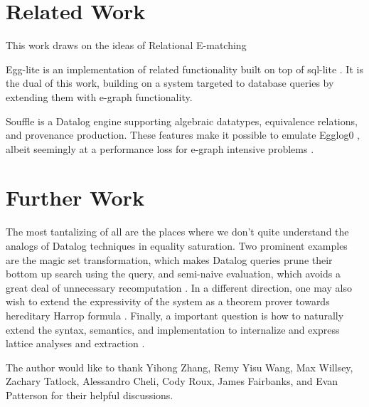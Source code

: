 \documentclass[sigplan,10pt,review]{acmart} %
\begin{document}
\section{Related Work}
This work draws on the ideas of Relational E-matching \cite{rel_ematch}

Egg-lite is an implementation of related functionality built on top of sql-lite \cite{egg-lite}. It is the dual of this work, building on a system targeted to database queries by extending them with e-graph functionality.

Souffle\cite{souffle} is a Datalog engine supporting algebraic datatypes, equivalence relations, and provenance production. These features make it possible to emulate Egglog0 \cite{naivesouffle}, albeit seemingly at a performance loss for e-graph intensive problems \cite{soufflehack}.

\section{Further Work}
The most tantalizing of all are the places where we don't quite understand the analogs of Datalog techniques in equality saturation.
Two prominent examples are the magic set transformation, which makes Datalog queries prune their bottom up search using the query, and semi-naive evaluation, which avoids a great deal of unnecessary recomputation \cite{databases}.
In a different direction, one may also wish to extend the expressivity of the system as a theorem prover towards hereditary Harrop formula \cite{miller_nadathur_2012}.
Finally, a important question is how to naturally extend the syntax, semantics, and implementation to internalize and express lattice analyses and extraction \cite{egg}.

\begin{acks}                            %
The author would like to thank Yihong Zhang, Remy Yisu Wang, Max Willsey, Zachary Tatlock, Alessandro Cheli, Cody Roux, James Fairbanks, and Evan Patterson for their helpful discussions.
\end{acks}






\end{document}
